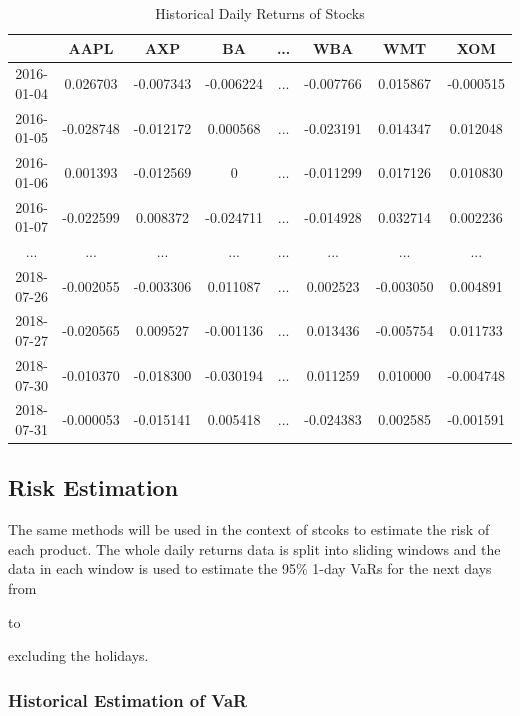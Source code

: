 \documentclass[11pt]{article} %
\theoremstyle{plain}
\theoremstyle{definition}
\begin{document}
{
  \begin{table}[ht]
    \centering
    \scriptsize
    \begin{tabular}{|c|c c c c c c c|}
      \hline
       & AAPL & AXP & BA & ... & WBA & WMT & XOM \\ [0.5ex]
      \hline
      2016-01-04 & 0.026703 & -0.007343 & -0.006224 & ... & -0.007766 & 0.015867 & -0.000515 \\
      \hline
      2016-01-05 & -0.028748 & -0.012172 & 0.000568 & ... & -0.023191 & 0.014347 & 0.012048 \\
      \hline
      2016-01-06 & 0.001393 & -0.012569 & 0 & ... & -0.011299 & 0.017126 & 0.010830 \\
      \hline
      2016-01-07 & -0.022599 & 0.008372 & -0.024711 & ... & -0.014928 & 0.032714 & 0.002236 \\
      \hline
      ... & ... & ... & ... & ... & ... & ... & ... \\
      \hline
      2018-07-26 & -0.002055 & -0.003306 & 0.011087 & ... & 0.002523 & -0.003050 & 0.004891 \\
      \hline
      2018-07-27 & -0.020565 & 0.009527 & -0.001136 & ... & 0.013436 & -0.005754 & 0.011733 \\
      \hline
      2018-07-30 & -0.010370 & -0.018300 & -0.030194 & ... & 0.011259 & 0.010000 & -0.004748 \\
      \hline
      2018-07-31 & -0.000053 & -0.015141 & 0.005418 & ... & -0.024383 & 0.002585 & -0.001591 \\
      \hline
    \end{tabular}
    \caption{Historical Daily Returns of Stocks}
    \label{table:drstock}
  \end{table}
}

\subsection{Risk Estimation}

The same methods will be used in the context of stcoks to estimate the risk of each product. The whole daily returns data is split into sliding windows and the data in each window is used to estimate the 95\% 1-day VaRs for the next days from \date{10th March 2016} to \date{31st July 2018} excluding the holidays.

\subsubsection{Historical Estimation of VaR}
\end{document}
